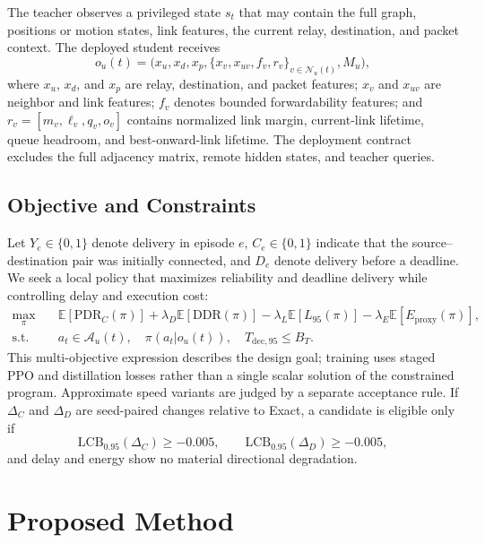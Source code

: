 \documentclass[drones,article,submit,moreauthors]{Definitions/mdpi}
\newcommand{\pdr}{\mathrm{PDR}}
\newcommand{\E}{\mathbb{E}}
\begin{document}
The teacher observes a privileged state $s_t$ that may contain the full graph, positions or motion states, link features, the current relay, destination, and packet context. The deployed student receives
\begin{equation}
o_u(t)=\big(x_u, x_d, x_p, \{x_v,x_{uv},f_v,r_v\}_{v\in\mathcal{N}_u(t)},M_u\big),
\end{equation}
where $x_u$, $x_d$, and $x_p$ are relay, destination, and packet features; $x_v$ and $x_{uv}$ are neighbor and link features; $f_v$ denotes bounded forwardability features; and $r_v=[m_v,\ell_v,q_v,o_v]$ contains normalized link margin, current-link lifetime, queue headroom, and best-onward-link lifetime. The deployment contract excludes the full adjacency matrix, remote hidden states, and teacher queries.

\subsection{Objective and Constraints}

Let $Y_e\in\{0,1\}$ denote delivery in episode $e$, $C_e\in\{0,1\}$ indicate that the source--destination pair was initially connected, and $D_e$ denote delivery before a deadline. We seek a local policy that maximizes reliability and deadline delivery while controlling delay and execution cost:
\begin{align}
\max_{\pi} \quad & \E[\pdr_C(\pi)] + \lambda_D\E[\mathrm{DDR}(\pi)] - \lambda_L\E[L_{95}(\pi)]-\lambda_E\E[E_{\mathrm{proxy}}(\pi)],\\
\text{s.t.}\quad & a_t\in\mathcal{A}_u(t),\quad \pi(a_t|o_u(t)),\quad T_{\mathrm{dec},95}\leq B_T.
\end{align}
This multi-objective expression describes the design goal; training uses staged PPO and distillation losses rather than a single scalar solution of the constrained program. Approximate speed variants are judged by a separate acceptance rule. If $\Delta_C$ and $\Delta_D$ are seed-paired changes relative to Exact, a candidate is eligible only if
\begin{equation}
\mathrm{LCB}_{0.95}(\Delta_C)\geq-0.005,\qquad
\mathrm{LCB}_{0.95}(\Delta_D)\geq-0.005,
\label{eq:gate}
\end{equation}
and delay and energy show no material directional degradation.

\section{Proposed Method}
\end{document}
